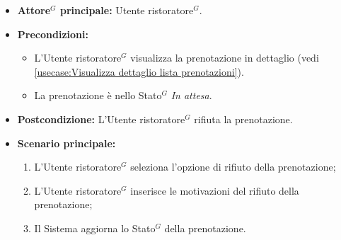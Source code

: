 \label{usecase:Rifiuta prenotazione}
\begin{itemize}
	\item \textbf{\gls{Attore}$^G$ principale:} \gls{Utente ristoratore}$^G$.

	\item \textbf{Precondizioni:}
	      \begin{itemize}
		      \item L'\gls{Utente ristoratore}$^G$ visualizza la prenotazione in dettaglio (vedi \autoref{usecase:Visualizza dettaglio lista prenotazioni}).
		      \item La prenotazione è nello \gls{Stato}$^G$ \textit{In attesa}.
	      \end{itemize}

	\item \textbf{Postcondizione:} L'\gls{Utente ristoratore}$^G$ rifiuta la prenotazione.



	\item \textbf{Scenario principale:}
	      \begin{enumerate}
		      \item L'\gls{Utente ristoratore}$^G$ seleziona l'opzione di rifiuto della prenotazione;

		      \item L'\gls{Utente ristoratore}$^G$ inserisce le motivazioni del rifiuto della prenotazione;

		      \item Il Sistema aggiorna lo \gls{Stato}$^G$ della prenotazione.

	      \end{enumerate}
\end{itemize}
